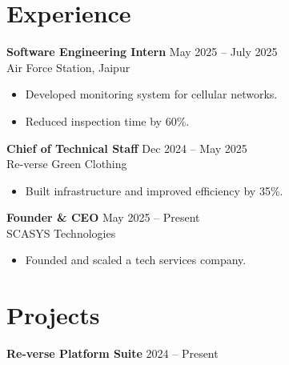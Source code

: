 \documentclass[a4paper,10pt]{article}
\begin{document}

\section{Experience}



\textbf{Software Engineering Intern} \hfill May 2025 -- July 2025 \\

Air Force Station, Jaipur

\begin{itemize}[nosep]

\item Developed monitoring system for cellular networks.

\item Reduced inspection time by 60\%.

\end{itemize}



\textbf{Chief of Technical Staff} \hfill Dec 2024 -- May 2025 \\

Re-verse Green Clothing

\begin{itemize}[nosep]

\item Built infrastructure and improved efficiency by 35\%.

\end{itemize}



\textbf{Founder \& CEO} \hfill May 2025 -- Present \\

SCASYS Technologies

\begin{itemize}[nosep]

\item Founded and scaled a tech services company.

\end{itemize}




\section{Projects}



\textbf{Re-verse Platform Suite} \hfill 2024 -- Present
\end{document}
